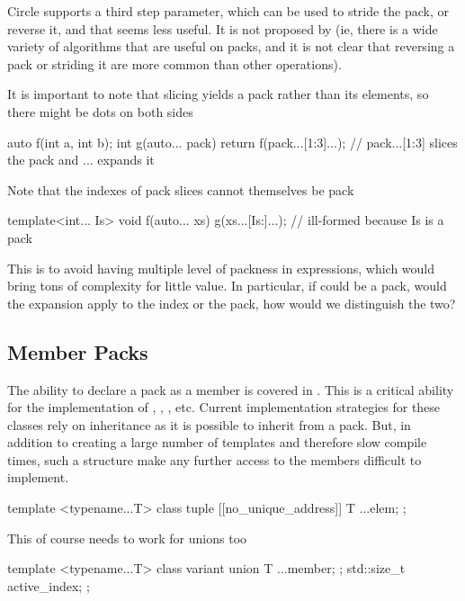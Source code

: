 \documentclass{wg21}
\begin{document}
Circle supports a third step parameter, which can be used to stride the pack, or reverse it,
and that seems less useful. It is not proposed by  (ie, there is a wide variety of algorithms that
are useful on packs, and it is not clear that reversing a pack or striding it are more common than other operations).

It is important to note that slicing yields a pack rather than its elements, so there might be dots on both sides

\begin{colorblock}
auto f(int a, int b);
int g(auto... pack) {
    return f(pack...[1:3]...); // pack...[1:3] slices the pack and ... expands it
}
\end{colorblock}

Note that the indexes of pack slices cannot themselves be pack

\begin{colorblock}
template<int... Is>
void f(auto... xs) {
    g(xs...[Is:]...); // ill-formed because Is is a pack
}
\end{colorblock}

This is to avoid having multiple level of packness in expressions, which would bring tons of complexity for little value.
In particular, if  could be a pack, would the expansion apply to the index or the pack, how would we distinguish the two?

\subsection{Member Packs}
\label{sec:memberpack}

The ability to declare a pack as a member is covered in .
This is a critical ability for the implementation of , , , etc.
Current implementation strategies for these classes rely on inheritance as it is possible to inherit from a pack.
But, in addition to creating a large number of templates and therefore slow compile times, such a structure make any further access to the members
difficult to implement.

\begin{colorblock}
template <typename...T>
class tuple {
    [[no_unique_address]] T ...elem;
};
\end{colorblock}

This of course needs to work for unions too

\begin{colorblock}
template <typename...T>
class variant {
    union {
        T ...member;
    };
    std::size_t active_index;
};
\end{colorblock}
\end{document}
